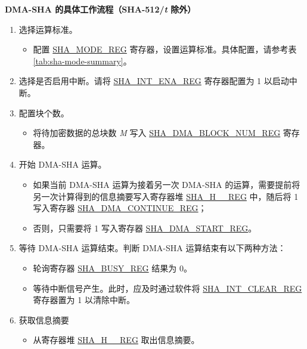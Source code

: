 \documentclass[main\_\_CN.tex]{subfiles}
\begin{document}
\textbf{DMA-SHA 的具体工作流程（SHA-512/{\it{t}} 除外）}

\begin{enumerate}
    \item 选择运算标准。
    \begin{itemize}
        \item 配置 \hyperref[regdesc:SHAMODEREG]{SHA\_MODE\_REG} 寄存器，设置运算标准。具体配置，请参考表 \ref{tab:sha-mode-summary}。
    \end{itemize}
    \item 选择是否启用中断。请将 \hyperref[regdesc:SHAINTENAREG]{SHA\_INT\_ENA\_REG} 寄存器配置为 1 以启动中断。
    \item 配置块个数。
    \begin{itemize}
        \item  将待加密数据的总块数 {\it{M}} 写入  \hyperref[regdesc:SHADMABLOCKNUMREG]{SHA\_DMA\_BLOCK\_NUM\_REG} 寄存器。
    \end{itemize}
    \item 开始 DMA-SHA 运算。
        \begin{itemize}
            \item 如果当前 DMA-SHA 运算为接着另一次 DMA-SHA 的运算，需要提前将另一次计算得到的信息摘要写入寄存器堆 \hyperref[regdesc:SHAHNREG]{SHA\_H\_\_REG} 中，随后将 1 写入寄存器 \hyperref[regdesc:SHADMACONTINUEREG]{SHA\_DMA\_CONTINUE\_REG}；
            \item 否则，只需要将 1 写入寄存器 \hyperref[regdesc:SHADMASTARTREG]{SHA\_DMA\_START\_REG}。
        \end{itemize}
    \item 等待 DMA-SHA 运算结束。判断 DMA-SHA 运算结束有以下两种方法：
        \begin{itemize}
            \item 轮询寄存器 \hyperref[regdesc:SHABUSYREG]{SHA\_BUSY\_REG} 结果为 0。
            \item 等待中断信号产生。此时，应及时通过软件将 \hyperref[regdesc:SHAINTCLEARREG]{SHA\_INT\_CLEAR\_REG} 寄存器置为 1 以清除中断。
        \end{itemize}

    \item 获取信息摘要
    \begin{itemize}
        \item 从寄存器堆 \hyperref[regdesc:SHAHNREG]{SHA\_H\_\_REG} 取出信息摘要。
    \end{itemize}
\end{enumerate}
\end{document}
